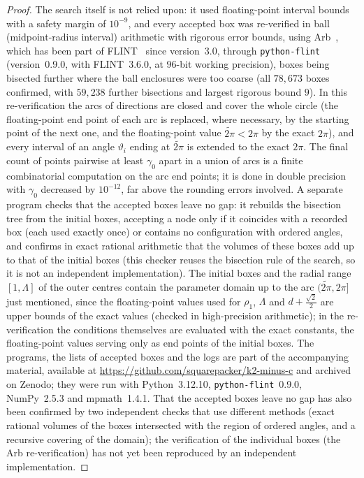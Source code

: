 \documentclass[11pt]{amsart}
\theoremstyle{definition}
\theoremstyle{remark}
\begin{document}
\begin{proof}
The search itself is not relied upon: it used floating-point interval bounds with a safety margin of $10^{-9}$, and every accepted
box was re-verified in ball (midpoint-radius interval) arithmetic with rigorous error bounds, using Arb~\cite{Arb}, which has been part
of FLINT~\cite{FLINT} since version~3.0, through \texttt{python-flint}~\cite{pyflint} (version~0.9.0, with FLINT~3.6.0, at $96$-bit
working precision), boxes being bisected further where the ball enclosures were too coarse (all $78{,}673$ boxes confirmed, with $59{,}238$ further bisections and largest rigorous bound $9$).
In this re-verification the arcs of directions are closed and cover the whole circle (the floating-point end point of each arc is
replaced, where necessary, by the starting point of the next one, and the floating-point value $\widetilde{2\pi}<2\pi$ by the exact
$2\pi$), and every interval of an angle $\vartheta_i$ ending at $\widetilde{2\pi}$ is extended to the exact $2\pi$. The final count of
points pairwise at least $\gamma_0$ apart in a union of arcs is a finite combinatorial computation on the arc end points; it is done
in double precision with $\gamma_0$ decreased by $10^{-12}$, far above the rounding errors involved.
A separate program checks that the accepted boxes leave no gap: it rebuilds the bisection tree from the initial boxes, accepting
a node only if it coincides with a recorded box (each used exactly once) or contains no configuration with ordered angles, and
confirms in exact rational arithmetic that the volumes of these boxes add up to that of the initial boxes (this checker reuses
the bisection rule of the search, so it is not an independent implementation). The initial boxes and the radial range $[1,\Lambda]$ of the outer centres
contain the parameter domain up to the arc $(\widetilde{2\pi},2\pi]$ just mentioned, since the floating-point values used for
$\rho_1$, $\Lambda$ and $d+\frac{\sqrt2}2$ are upper bounds of the exact values (checked in high-precision arithmetic);
in the re-verification the conditions themselves are evaluated with the exact constants, the floating-point values serving only
as end points of the initial boxes.
The programs, the lists of accepted boxes and the logs are part of the accompanying material, available at
\url{https://github.com/squarepacker/k2-minus-c} and archived on Zenodo; they were run with Python~3.12.10,
\texttt{python-flint}~0.9.0, NumPy~2.5.3 and mpmath~1.4.1. That the accepted boxes leave no gap has also been confirmed by two independent checks
that use different methods (exact rational volumes of the boxes intersected with the region of ordered angles, and a recursive
covering of the domain); the verification of the individual boxes (the Arb re-verification) has not yet been reproduced by an
independent implementation.
\end{proof}
\end{document}

